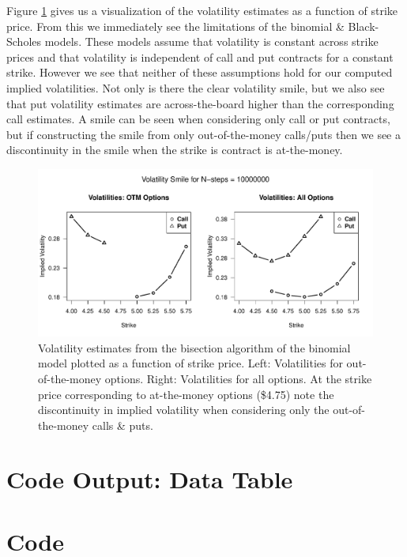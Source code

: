 \documentclass[12pt]{article}
\makeatletter
\let\oldappendix\appendix %
\renewcommand\appendix{%
    \oldappendix
    \newcommand{\section@cntformat}{\appendixname~\thesection\quad}
}
\makeatother
\begin{document}
Figure \ref{fig:smile} gives us a visualization of the volatility estimates as a function of strike price. From this we immediately see the limitations of the binomial \& Black-Scholes models. These models assume that volatility is constant across strike prices and that volatility is independent of call and put contracts for a constant strike. However we see that neither of these assumptions hold for our computed implied volatilities. Not only is there the clear volatility smile, but we also see that put volatility estimates are across-the-board higher than the corresponding call estimates. A smile can be seen when considering only call or put contracts, but if constructing the smile from only out-of-the-money calls/puts then we see a discontinuity in the smile when the strike is contract is at-the-money.

\begin{figure}[H]
	\centering
 	\includegraphics[scale=0.70]{../plots/smile.pdf}
\caption{Volatility estimates from the bisection algorithm of the binomial model plotted as a function of strike price. Left: Volatilities for out-of-the-money options. Right: Volatilities for all options. At the strike price corresponding to at-the-money options (\$4.75) note the discontinuity in implied volatility when considering only the out-of-the-money calls \& puts.}
\label{fig:smile}
\end{figure}


\newpage
\appendix
\section{Code Output: Data Table}\label{sec:data}

{\small
{}
}
 
\newpage
\section{Code}\label{sec:code}
\end{document}
